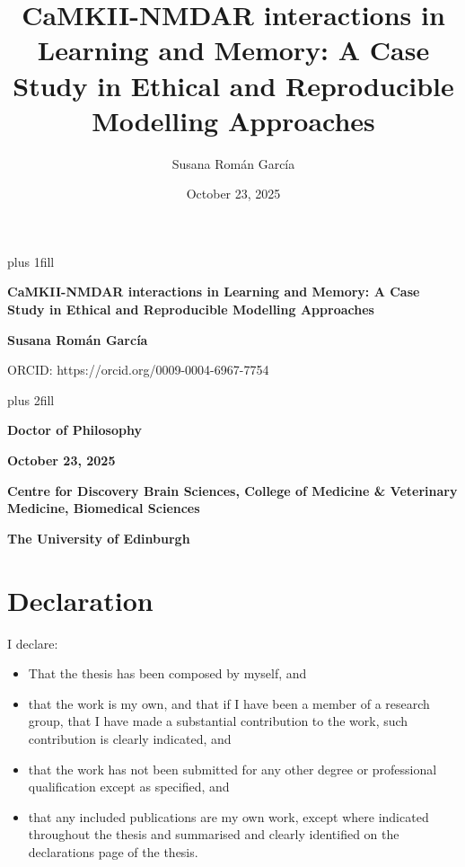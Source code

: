 \documentclass[
  11pt,
  letterpaper,
]{scrreprt}
\title{CaMKII-NMDAR interactions in Learning and Memory: A Case Study in
Ethical and Reproducible Modelling Approaches}
\author{Susana Román García}
\date{October 23, 2025}
\begin{document}
\cleardoublepage
\thispagestyle{empty}
{\centering
\hbox{}\vskip 0cm plus 1fill
{\Huge\bfseries CaMKII-NMDAR interactions in Learning and Memory: A Case
Study in Ethical and Reproducible Modelling Approaches \par}
\vspace{12ex}
{\Large\bfseries Susana Román García \par}
\vspace{3ex}
{\Large ORCID: https://orcid.org/0009-0004-6967-7754 \par}
\vskip 0cm plus 2fill
{\bfseries\large Doctor of Philosophy \par}
\vspace{3ex}
{\bfseries\large October 23, 2025 \par}
\vspace{12ex}
%
%
{\bfseries\large Centre for Discovery Brain Sciences, College of
Medicine \& Veterinary Medicine, Biomedical Sciences \par}
\vspace{3ex}
%
{\bfseries\large The University of Edinburgh \par}
%
\vspace{12ex}
{\small  \par}
}



\chapter*{Declaration}\label{declaration}


I declare:

\begin{itemize}
\item
  That the thesis has been composed by myself, and
\item
  that the work is my own, and that if I have been a member of a
  research group, that I have made a substantial contribution to the
  work, such contribution is clearly indicated, and
\item
  that the work has not been submitted for any other degree or
  professional qualification except as specified, and
\item
  that any included publications are my own work, except where indicated
  throughout the thesis and summarised and clearly identified on the
  declarations page of the thesis.
\end{itemize}
\end{document}
